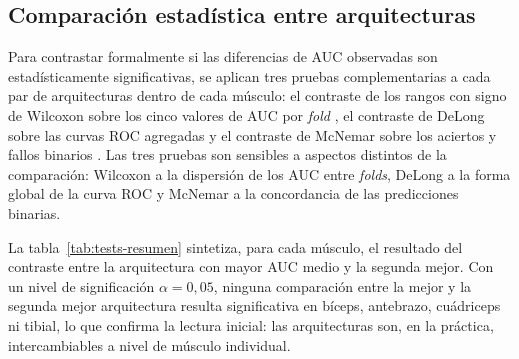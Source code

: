 \documentclass[12pt]{extarticle}
\numberwithin{equation}{section}
\begin{document}
\begin{refsection}
\subsection{Comparación estadística entre arquitecturas}\label{subsec:resultados-stat}

Para contrastar formalmente si las diferencias de AUC observadas son estadísticamente significativas, se aplican tres pruebas complementarias a cada par de arquitecturas dentro de cada músculo: el contraste de los rangos con signo de Wilcoxon sobre los cinco valores de AUC por \textit{fold} \cite{wilcoxon1945individual}, el contraste de DeLong sobre las curvas ROC agregadas \cite{delong1988comparing} y el contraste de McNemar sobre los aciertos y fallos binarios \cite{mcnemar1947note}. Las tres pruebas son sensibles a aspectos distintos de la comparación: Wilcoxon a la dispersión de los AUC entre \textit{folds}, DeLong a la forma global de la curva ROC y McNemar a la concordancia de las predicciones binarias.

La tabla~\ref{tab:tests-resumen} sintetiza, para cada músculo, el resultado del contraste entre la arquitectura con mayor AUC medio y la segunda mejor. Con un nivel de significación $\alpha = 0{,}05$, ninguna comparación entre la mejor y la segunda mejor arquitectura resulta significativa en bíceps, antebrazo, cuádriceps ni tibial, lo que confirma la lectura inicial: las arquitecturas son, en la práctica, intercambiables a nivel de músculo individual.

\begin{table}[h!]
\centering
\caption{Contraste estadístico entre la arquitectura de mayor AUC y la segunda mejor en cada músculo. Se reportan los AUC medios (en \%) y los $p$-valores de las tres pruebas. Ningún $p$-valor es inferior a $0{,}05$.}
\label{tab:tests-resumen}
\small
{}


\end{table}
\end{refsection}
\end{document}
